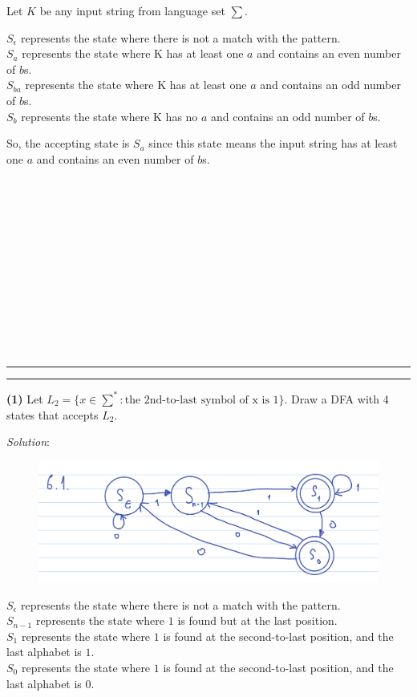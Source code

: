 \documentclass[a4paper, 11pt]{article}
\newcommand{\question}[2] {\vspace{.25in} \hrule\vspace{0.5em}
	\noindent{\bf #1: #2} \vspace{0.5em}
	\hrule \vspace{.10in}}
\renewcommand{\part}[1] {\vspace{.10in} {\bf (#1)}}
\begin{document}
	Let $K$ be any input string from language set $\sum$.
	
	$S_\epsilon$ represents the state where there is not a match with the pattern.\\
	$S_a$ represents the state where K has at least one $a$ and contains an even number of $b$s.\\
	$S_{ba}$ represents the state where K has at least one $a$ and contains an odd number of $b$s.\\
	$S_b$ represents the state where K has no $a$ and contains an odd number of $b$s.
	
	So, the accepting state is $S_a$ since this state means the input string has at least one $a$ and contains an even number of $b$s.
	\\\\\\\\\\\\\\\\\\\\\\\\\\
	
	
	\question{6}{Penultimate}
	\part{1} Let $L_2 = \{x \in \sum^{*}: \text{the 2nd-to-last symbol of x is 1}\}$. Draw a DFA with 4 states that accepts $L_2$.
	
	{\em Solution}:
	\begin{figure}[htbp]
		\centering
		\includegraphics[width=\linewidth]{figures/4.jpg}
	\end{figure}
	
	$S_\epsilon$ represents the state where there is not a match with the pattern.\\
	$S_{n-1}$ represents the state where $1$ is found but at the last position.\\
	$S_{1}$ represents the state where $1$ is found at the second-to-last position, and the last alphabet is $1$.\\
	$S_0$ represents the state where $1$ is found at the second-to-last position, and the last alphabet is $0$.\\
	
\end{document}
